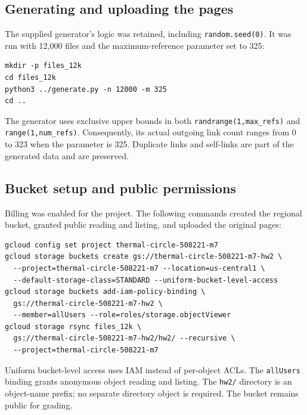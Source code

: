 \documentclass[10pt,letterpaper]{article}
\begin{document}
\subsection{Generating and uploading the pages}
The supplied generator's logic was retained, including \texttt{random.seed(0)}.
It was run with 12,000 files and the maximum-reference parameter set to 325:
\begin{lstlisting}
mkdir -p files_12k
cd files_12k
python3 ../generate.py -n 12000 -m 325
cd ..
\end{lstlisting}
The generator uses exclusive upper bounds in both \texttt{randrange(1,max\_refs)}
and \texttt{range(1,num\_refs)}. Consequently, its actual outgoing link count
ranges from 0 to 323 when the parameter is 325. Duplicate links and self-links
are part of the generated data and are preserved.

\subsection{Bucket setup and public permissions}
Billing was enabled for the project. The following commands created the regional
bucket, granted public reading and listing, and uploaded the original pages:
\begin{lstlisting}
gcloud config set project thermal-circle-508221-m7
gcloud storage buckets create gs://thermal-circle-508221-m7-hw2 \
  --project=thermal-circle-508221-m7 --location=us-central1 \
  --default-storage-class=STANDARD --uniform-bucket-level-access
gcloud storage buckets add-iam-policy-binding \
  gs://thermal-circle-508221-m7-hw2 \
  --member=allUsers --role=roles/storage.objectViewer
gcloud storage rsync files_12k \
  gs://thermal-circle-508221-m7-hw2/hw2/ --recursive \
  --project=thermal-circle-508221-m7
\end{lstlisting}
Uniform bucket-level access uses IAM instead of per-object ACLs. The
\texttt{allUsers} binding grants anonymous object reading and listing. The
\texttt{hw2/} directory is an object-name prefix; no separate directory object
is required. The bucket remains public for grading.

\clearpage
\end{document}

